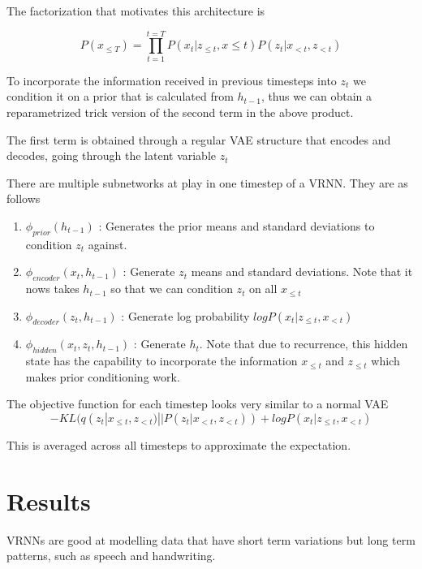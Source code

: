 \documentclass{article}
\begin{document}
The factorization that motivates this architecture is

\[ 
   P(x_{\le T}) = \prod_{t=1}^{t=T} P(x_t | z_{\le t},x{\le t}) 
                                    P (z_t | x_{<t}, z_{<t})
\]

To incorporate the information received in previous timesteps into $ z_t $ we condition it on a prior that is calculated from $ h_{t-1} $, thus
we can obtain a reparametrized trick version of the second term in the above product.

The first term is obtained through a regular VAE structure that encodes and decodes, going through the latent variable $ z_t $ 

There are multiple subnetworks at play in one timestep of a VRNN. They are as follows

\begin{enumerate}
    \item{ $ \phi_{prior}(h_{t-1}) $ : Generates the prior means and 
        standard deviations to condition $ z_t $ against. }
    \item{ $ \phi_{encoder}(x_t, h_{t-1}) $ : Generate $ z_t $ means 
        and standard deviations. Note that it nows takes 
        $ h_{t-1} $ so that we can 
        condition $ z_t $ on all $ x_{\le t} $ }
    \item{ $ \phi_{decoder}(z_t, h_{t-1}) $ : Generate log 
        probability $ log P( x_{t} | z_{\le t}, x_{<t} ) $
        }
    \item{
            $ \phi_{hidden}(x_t, z_t, h_{t-1}) $ : Generate $ h_t $.
            Note that due to recurrence, this hidden state has the capability
            to incorporate the information $ x_{\le t} $ and $ z_{\le t} $
            which makes prior conditioning work.
        }
\end{enumerate}

The objective function for each timestep looks very similar to a normal VAE
\[
    - KL(q(z_t | x_{\le t}, z_{<t}) || P(z_t | x_{<t}, z_{<t} ))
    + log P(x_t | z_{\le t}, x_{<t})
\]

This is averaged across all timesteps to approximate the expectation.

\section{Results}

VRNNs are good at modelling data that have short term variations but long term patterns, such as
speech and handwriting.
\end{document}
